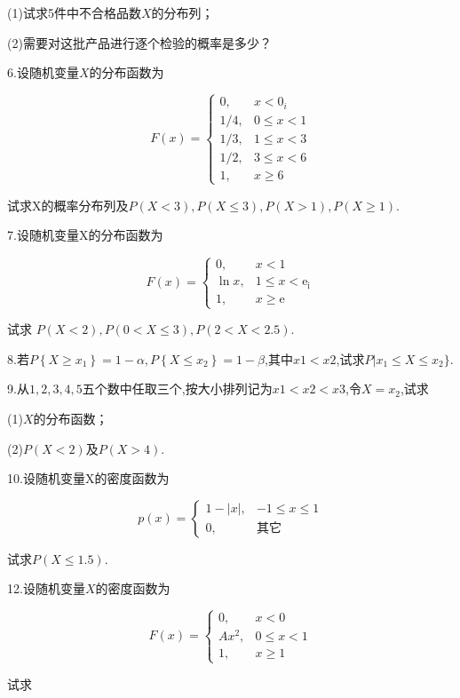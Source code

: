 (1)试求5件中不合格品数$ X $的分布列；

(2)需要对这批产品进行逐个检验的概率是多少？

6.设随机变量$ X $的分布函数为

\[ 
F(x)=\left\{\begin{array}{ll}
{0,} & {x<0_{i}} \\ {1 / 4,} & {0 \leqslant x<1} \\ 
{1 / 3,} & {1 \leqslant x<3} \\ {1 / 2,} & {3 \leqslant x<6} \\ 
{1,} & {x \geqslant 6}
\end{array}\right.
\]

试求X的概率分布列及$P(X<3), P(X \leqslant 3), P(X>1), P(X \geqslant 1)$.

7.设随机变量X的分布函数为

\[ 
F(x)=\left\{\begin{array}{ll}
{0,} & {x<1} \\ {\ln x,} & {1 \leqslant x<\mathrm{e}_{\mathrm{i}}} \\ 
{1,} & {x \geqslant \mathrm{e}}
\end{array}\right.
\]

试求 $P(X<2), P(0<X \leqslant 3), P(2<X<2.5)$.

8.若$P\left\{X \geqslant x_{1}\right\}=1-\alpha, P\left\{X \leqslant x_{2}\right\}=1-\beta$,其中$ x1<x2 $,试求$P | x_{1} \leqslant X \leqslant x_{2} \}$.

9.从$ 1,2,3,4,5 $五个数中任取三个,按大小排列记为$ x1<x2<x3 $,令$ X=x_2 $,试求

(1)$ X $的分布函数；

(2)$ P(X<2) $及$ P(X>4) $.

10.设随机变量X的密度函数为

\[ 
p(x)=\left\{\begin{array}{ll}
{1-|x|,} & {-1 \leqslant x \leqslant 1} \\ 
{0,} & {\text{其它}}
\end{array}\right.
\]

试求$ P(X≤1.5) $.

12.设随机变量$ X $的密度函数为

\[ 
F(x)=\left\{\begin{array}{ll}
{0,} & {x<0} \\ 
{A x^{2},} & {0 \leqslant x<1} \\ 
{1,} & {x \geqslant 1}
\end{array}\right.
\]

试求


